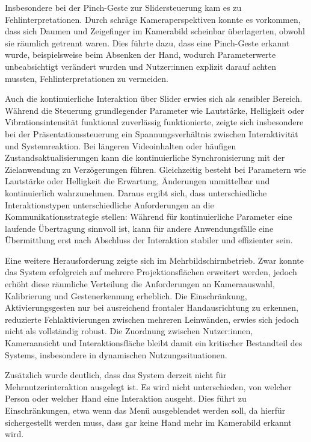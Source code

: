Insbesondere bei der Pinch-Geste zur Slidersteuerung kam es zu Fehlinterpretationen. Durch schräge Kameraperspektiven konnte es vorkommen, dass sich Daumen und Zeigefinger im Kamerabild scheinbar überlagerten, obwohl sie räumlich getrennt waren. Dies führte dazu, dass eine Pinch-Geste erkannt wurde, beispielsweise beim Absenken der Hand, wodurch Parameterwerte unbeabsichtigt verändert wurden und Nutzer:innen explizit darauf achten mussten, Fehlinterpretationen zu vermeiden.

Auch die kontinuierliche Interaktion über Slider erwies sich als sensibler Bereich. Während die Steuerung grundlegender Parameter wie Lautstärke, Helligkeit oder Vibrationsintensität funktional zuverlässig funktionierte, zeigte sich insbesondere bei der Präsentationssteuerung ein Spannungsverhältnis zwischen Interaktivität und Systemreaktion. Bei längeren Videoinhalten oder häufigen Zustandsaktualisierungen kann die kontinuierliche Synchronisierung mit der Zielanwendung zu Ver\-zögerungen führen. Gleichzeitig besteht bei Parametern wie Lautstärke oder Helligkeit die Erwartung, Änderungen unmittelbar und kontinuierlich wahrzunehmen. Daraus ergibt sich, dass unterschiedliche Interaktionstypen unterschiedliche Anforderungen an die Kommunikationsstrategie stellen: Während für kontinuierliche Parameter eine laufende Übertragung sinnvoll ist, kann für andere Anwendungsfälle eine Übermittlung erst nach Abschluss der Interaktion stabiler und effizienter sein.

Eine weitere Herausforderung zeigte sich im Mehrbildschirmbetrieb. Zwar konnte das System erfolgreich auf mehrere Projektionsflächen erweitert werden, jedoch erhöht diese räumliche Verteilung die Anforderungen an Kameraauswahl, Kalibrierung und Gestenerkennung erheblich. Die Einschränkung, Aktivierungsgesten nur bei ausreichend frontaler Handausrichtung zu erkennen, reduzierte Fehlaktivierungen zwischen mehreren Leinwänden, erwies sich jedoch nicht als vollständig robust. Die Zuordnung zwischen Nutzer:innen, Kameraansicht und Interaktionsfläche bleibt damit ein kritischer Bestandteil des Systems, insbesondere in dynamischen Nutzungssituationen.

Zusätzlich wurde deutlich, dass das System derzeit nicht für Mehrnutzerinteraktion ausgelegt ist. Es wird nicht unterschieden, von welcher Person oder welcher Hand eine Interaktion ausgeht. Dies führt zu Einschränkungen, etwa wenn das Menü ausgeblendet werden soll, da hierfür sichergestellt werden muss, dass gar keine Hand mehr im Kamerabild erkannt wird.

